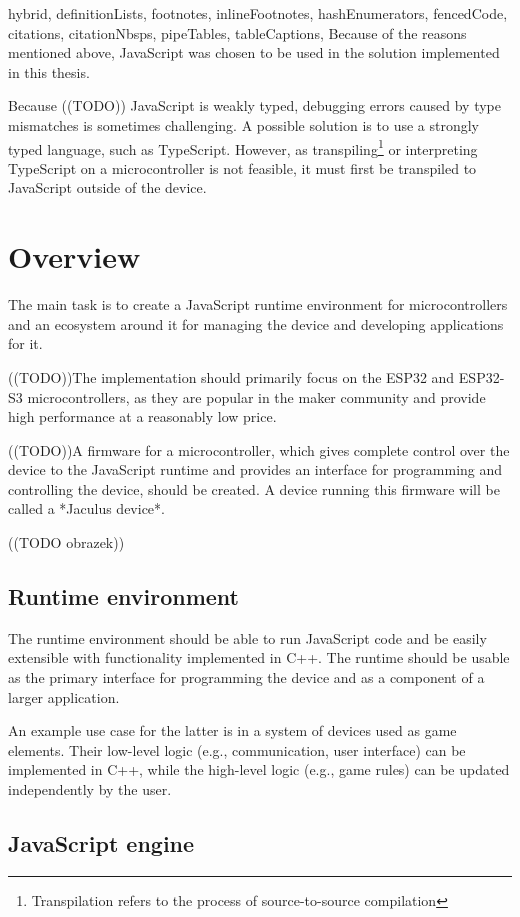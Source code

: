 \begin{markdown*}{%
  hybrid,
  definitionLists,
  footnotes,
  inlineFootnotes,
  hashEnumerators,
  fencedCode,
  citations,
  citationNbsps,
  pipeTables,
  tableCaptions,
}
Because of the reasons mentioned above, JavaScript was chosen to be used in the solution implemented in this thesis.

Because ((TODO)) JavaScript is weakly typed, debugging errors caused by type mismatches is sometimes challenging. A possible solution is to use a strongly typed language, such as TypeScript. However, as transpiling\footnote{Transpilation refers to the process of source-to-source compilation} or interpreting TypeScript on a microcontroller is not feasible, it must first be transpiled to JavaScript outside of the device.


\chapter{Overview}

The main task is to create a JavaScript runtime environment for microcontrollers and an ecosystem around it for managing the device and developing applications for it.

((TODO))The implementation should primarily focus on the ESP32 and ESP32-S3 microcontrollers, as they are popular in the maker community and provide high performance at a reasonably low price.

((TODO))A firmware for a microcontroller, which gives complete control over the device to the JavaScript runtime and provides an interface for programming and controlling the device, should be created. A device running this firmware will be called a *Jaculus device*.

((TODO obrazek))

\section{Runtime environment}

The runtime environment should be able to run JavaScript code and be easily extensible with functionality implemented in C++. The runtime should be usable as the primary interface for programming the device and as a component of a larger application.

An example use case for the latter is in a system of devices used as game elements. Their low-level logic (e.g., communication, user interface) can be implemented in C++, while the high-level logic (e.g., game rules) can be updated independently by the user.

\section{JavaScript engine}


\end{markdown*}
